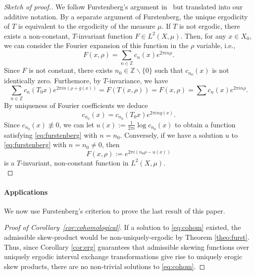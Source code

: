 \documentclass{amsart}
\theoremstyle{definition}
\theoremstyle{remark}
\numberwithin{equation}{section}
\newcommand{\<}{{\langle}}
\renewcommand{\>}{{\rangle}}
\newcommand{\field}[1]{\mathbb{#1}}
\newcommand{\Z}{\field{Z}}
\newcommand{\minuszero}{\backslash\{0\}}
\begin{document}
\begin{proof}[Sketch of proof.]
    We follow Furstenberg's argument in~\cite[Lemma 2.1]{Fu61} but translated into our additive notation. By a separate argument of Furstenberg, the unique ergodicity of $T$ is equivalent to the ergodicity of the measure $\mu$. If $T$ is not ergodic, there exists a non-constant, $T$-invariant function  $F \in L^2(X, \mu)$. Then, for any $x \in X_0$, we can consider the Fourier expansion of this function in the $\rho$ variable, i.e., \begin{equation}\label{eq:fourier} F(x, \rho) = \sum_{n \in \Z} c_n(x) e^{2\pi i n \rho}.\end{equation} Since $F$ is not constant, there exists $n_0 \in \Z\minuszero$ such that $c_{n_0}(x)$ is not identically zero. Furthemore, by $T$-invariance, we have $$\sum_{n \in \Z} c_n(T_0 x) e^{2\pi i n(\rho+g(x))} = F(T(x, \rho)) = F(x, \rho) = \sum c_n(x) e^{2\pi in \rho}.$$ By uniqueness of Fourier coefficients we deduce $$c_{n_0}(x) = c_{n_0}(T_0 x) e^{2\pi i n g(x)}.$$ Since $c_{n_0} (x) \not\equiv 0$, we can let $u(x) := \frac{1}{2\pi i} \log c_{n_0}(x)$ to obtain a function satisfying \eqref{eq:furstenberg} with $n=n_0$. Conversely, if we have a solution $u$ to \eqref{eq:furstenberg} with $n=n_0 \neq 0$, then $$F(x, \rho) := e^{2\pi i(n_0 \rho-u(x))}$$ is a $T$-invariant, non-constant function in $L^2(X,\mu)$.\\
\end{proof}


\paragraph*{\bf Applications} 
We now use Furstenberg's criterion to prove the last result of this paper.

\begin{proof}[Proof of Corollary~\ref{cor:cohomological}]
    If a solution to \eqref{eq:cohom} existed, the admissible skew-product would be non-uniquely-ergodic by Theorem \ref{theo:furst}. Thus, since Corollary \ref{cor:erg} guarantees that admissible skewing functions over uniquely ergodic interval exchange transformations give rise to uniquely erogic skew products, there are no non-trivial solutions to \eqref{eq:cohom}.\qedhere
\end{proof}
\end{document}
